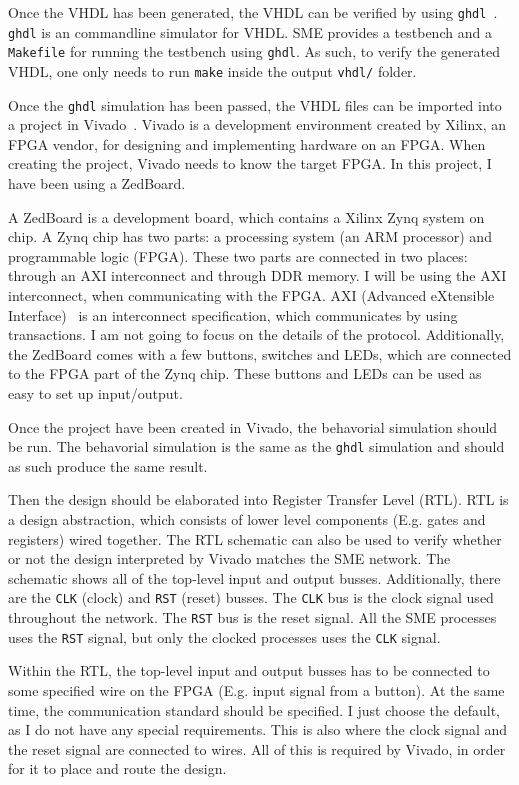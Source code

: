 Once the VHDL has been generated, the VHDL can be verified by using
\texttt{ghdl}~\cite{ref:ghdl}. \texttt{ghdl} is an commandline simulator for
VHDL. SME provides a testbench and a \texttt{Makefile} for running the
testbench using \texttt{ghdl}. As such, to verify the generated VHDL, one only
needs to run \texttt{make} inside the output \texttt{vhdl/} folder.

Once the \texttt{ghdl} simulation has been passed, the VHDL files can be
imported into a project in Vivado~\cite{ref:vivado}. Vivado is a development
environment created by Xilinx, an FPGA vendor, for designing and implementing
hardware on an FPGA.  When creating the project, Vivado needs to know the
target FPGA. In this project, I have been using a ZedBoard.

A ZedBoard is a development board, which contains a Xilinx Zynq system on chip.
A Zynq chip has two parts: a processing system (an ARM processor) and
programmable logic (FPGA). These two parts are connected in two places: through
an AXI interconnect and through DDR memory.  I will be using the AXI
interconnect, when communicating with the FPGA.  AXI (Advanced eXtensible
Interface)~\cite{ref:axi} is an interconnect specification, which communicates
by using transactions. I am not going to focus on the details of the protocol.
Additionally, the ZedBoard comes with a few buttons, switches and LEDs, which
are connected to the FPGA part of the Zynq chip.  These buttons and LEDs can be
used as easy to set up input/output.

Once the project have been created in Vivado, the behavorial simulation should
be run. The behavorial simulation is the same as the \texttt{ghdl} simulation
and should as such produce the same result.

Then the design should be elaborated into Register Transfer Level (RTL). RTL is
a design abstraction, which consists of lower level components (E.g. gates and
registers) wired together. The RTL schematic can also be used to verify whether
or not the design interpreted by Vivado matches the SME network. The schematic
shows all of the top-level input and output busses. Additionally, there are the
\texttt{CLK} (clock) and \texttt{RST} (reset) busses. The \texttt{CLK} bus is
the clock signal used throughout the network.  The \texttt{RST} bus is the
reset signal. All the SME processes uses the \texttt{RST} signal, but only the
clocked processes uses the \texttt{CLK} signal.

Within the RTL, the top-level input and output busses has to be connected to
some specified wire on the FPGA (E.g. input signal from a button). At the same
time, the communication standard should be specified. I just choose the
default, as I do not have any special requirements. This is also where the
clock signal and the reset signal are connected to wires. All of this is
required by Vivado, in order for it to place and route the design.

